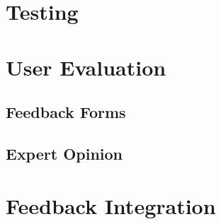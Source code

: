 \section{Testing}
\section{User Evaluation}
\subsection{Feedback Forms}
\subsection{Expert Opinion}
\section{Feedback Integration}